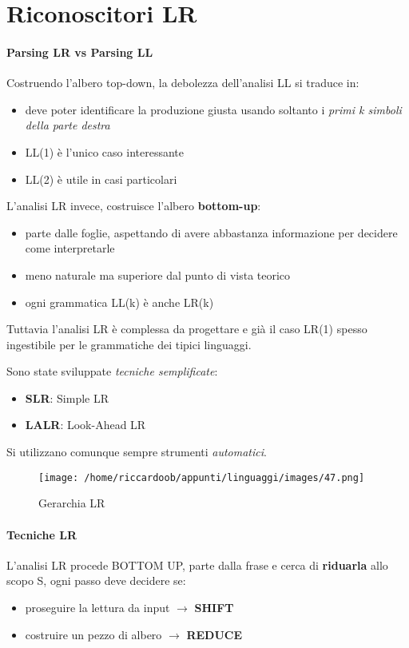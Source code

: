 \chapter{Riconoscitori LR}

\subsubsection{Parsing LR vs Parsing LL}
Costruendo l'albero top-down, la debolezza dell'analisi LL si traduce in:
\begin{itemize}
    \item deve poter identificare la produzione giusta usando soltanto i \textit{primi k simboli della parte destra}
    \item LL(1) è l'unico caso interessante
    \item LL(2) è utile in casi particolari
\end{itemize}

L'analisi LR invece, costruisce l'albero \textbf{bottom-up}:
\begin{itemize}
    \item parte dalle foglie, aspettando di avere abbastanza informazione per decidere come interpretarle
    \item meno naturale ma superiore dal punto di vista teorico
    \item ogni grammatica LL(k) è anche LR(k)
\end{itemize}

Tuttavia l'analisi LR è complessa da progettare e già il caso LR(1) spesso ingestibile per le grammatiche dei tipici linguaggi.

Sono state sviluppate \textit{tecniche semplificate}:
\begin{itemize}
    \item \textbf{SLR}: Simple LR
    \item \textbf{LALR}: Look-Ahead LR
\end{itemize}

Si utilizzano comunque sempre strumenti \textit{automatici}.

\begin{figure}[H]
    \caption{Gerarchia LR}
    \centering
    \texttt{[image: /home/riccardoob/appunti/linguaggi/images/47.png]}
\end{figure}

\subsubsection{Tecniche LR}
L'analisi LR procede BOTTOM UP, parte dalla frase e cerca di \textbf{riduarla} allo scopo S, ogni passo deve decidere se:
\begin{itemize}
    \item proseguire la lettura da input $\rightarrow$ \textbf{SHIFT}
    \item costruire un pezzo di albero $\rightarrow$ \textbf{REDUCE}
\end{itemize}


